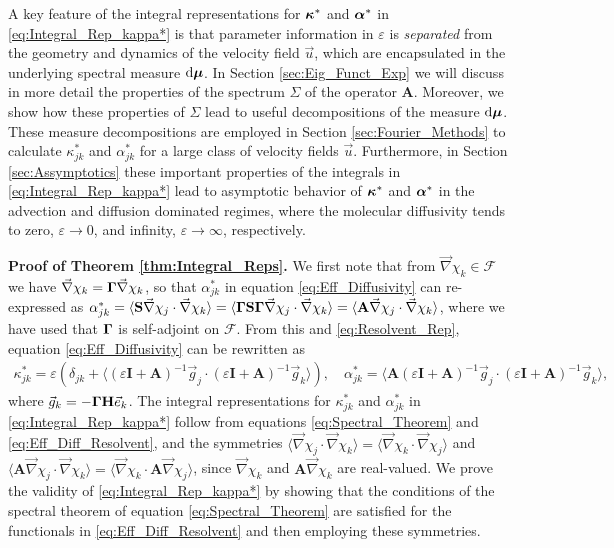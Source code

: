 \documentclass[11pt]{amsart}
\renewcommand{\d}{\mathrm{d}}
\newcommand{\Hb}{\mathbf{H}}
\newcommand{\Ib}{\mathbf{I}}
\newcommand{\Sb}{\mathbf{S}}
\newcommand{\Ab}{\mathbf{A}}
\newcommand{\Fs}{\mathscr{F}}
\newcommand\bmu{\mbox{\boldmath${\mu}$}}
\newcommand\balpha{\mbox{\boldmath${\alpha}$}}
\newcommand\bkappa{\mbox{\boldmath${\kappa}$}}
\newcommand\bGamma{\mbox{\boldmath${\Gamma}$}}
\begin{document}
A key feature of the integral representations for $\bkappa^*$ and
$\balpha^*$ in \eqref{eq:Integral_Rep_kappa*} is that parameter
information in $\varepsilon$ is \emph{separated} from the geometry and dynamics
of the velocity field $\vec{u}$, which are encapsulated in the
underlying spectral measure $\d\bmu$. In Section
\ref{sec:Eig_Funct_Exp} we will discuss in more detail the properties
of the spectrum $\Sigma$ of the operator $\Ab$. Moreover, we show how
these properties of $\Sigma$ lead to useful decompositions of the
measure $\d\bmu$. These measure decompositions are employed in Section 
\ref{sec:Fourier_Methods} to calculate $\kappa^*_{jk}$ and $\alpha^*_{jk}$ for a
large class of velocity fields $\vec{u}$. Furthermore, in Section
\ref{sec:Assymptotics} these important properties of the integrals in
\eqref{eq:Integral_Rep_kappa*} lead to asymptotic behavior of
$\bkappa^*$ and $\balpha^*$ in the advection and diffusion dominated
regimes, where the molecular diffusivity tends to zero, $\varepsilon\to0$, and
infinity, $\varepsilon\to\infty$, respectively.      



\textbf{Proof of Theorem \ref{thm:Integral_Reps}.}\hspace{1ex}
%
We first note that from $\vec{\nabla}\chi_k\in\Fs$ we have 
$\vec{\nabla}\chi_k=\bGamma\vec{\nabla}\chi_k$, so that $\alpha^*_{jk}$ in equation
\eqref{eq:Eff_Diffusivity} can re-expressed as
$\alpha^*_{jk}=\langle\Sb\vec{\nabla}\chi_j\cdot\vec{\nabla}\chi_k\rangle=\langle\bGamma\Sb\bGamma\vec{\nabla}\chi_j\cdot\vec{\nabla}\chi_k\rangle  
=\langle\Ab\vec{\nabla}\chi_j\cdot\vec{\nabla}\chi_k\rangle$, where we have used that $\bGamma$ is
self-adjoint on $\Fs$. From this and \eqref{eq:Resolvent_Rep},
equation \eqref{eq:Eff_Diffusivity} can be rewritten as
%
\begin{align}\label{eq:Eff_Diff_Resolvent}
 \kappa^*_{jk}=\varepsilon\left(\delta_{jk}+\langle(\varepsilon\Ib+\Ab)^{-1}\vec{g}_j\cdot(\varepsilon\Ib+\Ab)^{-1}\vec{g}_k\rangle\right), \quad
 \alpha^*_{jk}=\langle\Ab(\varepsilon\Ib+\Ab)^{-1}\vec{g}_j\cdot(\varepsilon\Ib+\Ab)^{-1}\vec{g}_k\rangle,
\end{align}
%
where $\vec{g}_k=-\bGamma\Hb\vec{e}_k$. The integral representations
for $\kappa^*_{jk}$ and $\alpha^*_{jk}$ in \eqref{eq:Integral_Rep_kappa*} follow
from equations \eqref{eq:Spectral_Theorem} and
\eqref{eq:Eff_Diff_Resolvent}, and the symmetries
$\langle\vec{\nabla}\chi_j\cdot\vec{\nabla}\chi_k\rangle=\langle\vec{\nabla}\chi_k\cdot\vec{\nabla}\chi_j\rangle$ and 
$\langle\Ab\vec{\nabla}\chi_j\cdot\vec{\nabla}\chi_k\rangle=\langle\vec{\nabla}\chi_k\cdot\Ab\vec{\nabla}\chi_j\rangle$, since
$\vec{\nabla}\chi_k$ and $\Ab\vec{\nabla}\chi_k$ are real-valued. We prove the
validity of \eqref{eq:Integral_Rep_kappa*} by showing that the
conditions of the spectral theorem of equation
\eqref{eq:Spectral_Theorem} are satisfied for the functionals in
\eqref{eq:Eff_Diff_Resolvent} and then employing these symmetries.    
\end{document}
